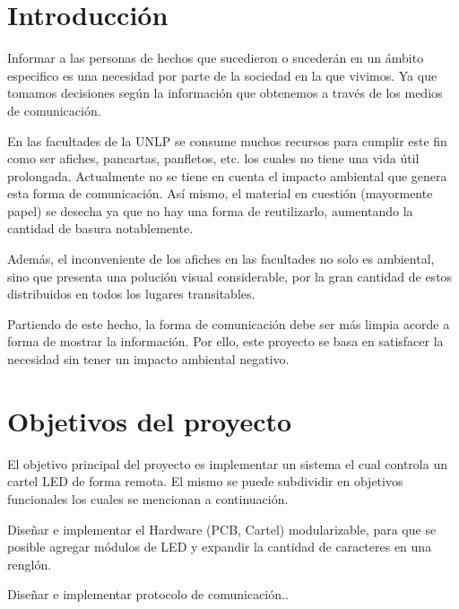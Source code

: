 \section{Introducción}
Informar a las personas de hechos que sucedieron o sucederán en un ámbito especifico es una necesidad por parte de la sociedad en la que vivimos. Ya que tomamos decisiones según la información que obtenemos a través de los medios de comunicación.

En las facultades de la UNLP se consume muchos recursos para cumplir este fin como ser afiches, pancartas, panfletos, etc. los cuales no tiene una vida útil prolongada. Actualmente no se tiene en cuenta el impacto ambiental que genera esta forma de comunicación.
Así mismo, el material en cuestión (mayormente papel) se desecha ya que no hay una forma de reutilizarlo, aumentando la cantidad de basura notablemente.

Además, el inconveniente de los afiches en las facultades no solo es ambiental, sino que presenta una polución visual considerable, por la gran cantidad de estos distribuidos en todos los lugares transitables.

Partiendo de este hecho, la forma de comunicación debe ser más limpia acorde a forma de mostrar la información.
Por ello, este proyecto se basa en satisfacer la necesidad sin tener un impacto ambiental negativo.

\section{Objetivos del proyecto}
El objetivo principal del proyecto es implementar un sistema el cual controla un cartel LED de forma remota.
El mismo se puede subdividir en objetivos funcionales los cuales se mencionan a continuación.

Diseñar e implementar el Hardware (PCB, Cartel) modularizable, para que se posible agregar módulos de LED y expandir la cantidad de caracteres en una renglón.

Diseñar e implementar protocolo de comunicación..

